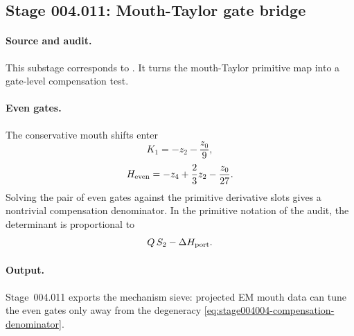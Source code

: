 \subsection*{Stage 004.011: Mouth-Taylor gate bridge}
\label{subsec:stage004011-mouth-taylor-gate-bridge}

\paragraph{Source and audit.}
This substage corresponds to
.
It turns the mouth-Taylor primitive map into a gate-level compensation test.

\paragraph{Even gates.}
The conservative mouth shifts enter
\begin{equation}
\label{eq:stage004011-k1}
K_1=-z_2-\frac{z_0}{9},
\end{equation}
\begin{equation}
\label{eq:stage004011-heven}
H_{\rm even}=-z_4+\frac23z_2-\frac{z_0}{27}.
\end{equation}
Solving the pair of even gates against the primitive derivative slots gives a
nontrivial compensation denominator.  In the primitive notation of the audit,
the determinant is proportional to
\begin{equation}
\label{eq:stage004004-compensation-denominator}
Q\,S_2-\Delta H_{\rm port}.
\end{equation}

\paragraph{Output.}
Stage~004.011 exports the mechanism sieve: projected EM mouth data can tune
the even gates only away from the degeneracy
\eqref{eq:stage004004-compensation-denominator}.
